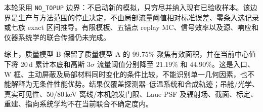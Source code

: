 本轮采用 \texttt{NO\_TOPUP} 边界：不启动新的模拟，只穷尽并纳入现有已验收样本。该边界是生产与方法范围的停止决定，不由局部流量阈值相对标准误差、零条入选记录或七族 exact 区间推导。有限模板、五锚点 replay MC、信号效率以及源、响应和仪器系统学的联合传播仍未完成。

综上，质量模型 B 保留了质量模型 A 的 $99.75\%$ 聚焦有效面积，并在当前中心值下将 20\,d 累计本底和高斯 $3\sigma$ 流量阈值分别降至 $21.19\%$ 和 $44.90\%$。这是入口、W 框、主动屏蔽及局部材料同时变化的条件比较，不能识别单一几何因素，也不能解释为无条件性能优势。结果仅覆盖探测器--低温系统和合成轨迹；吊舱/光学、真实可见性、50/80\,keV 离线/本机触发门限、Laue PSF 及辐射场、截面、标定、重建、指向系统学均不在当前联合不确定度内。

\FloatBarrier
